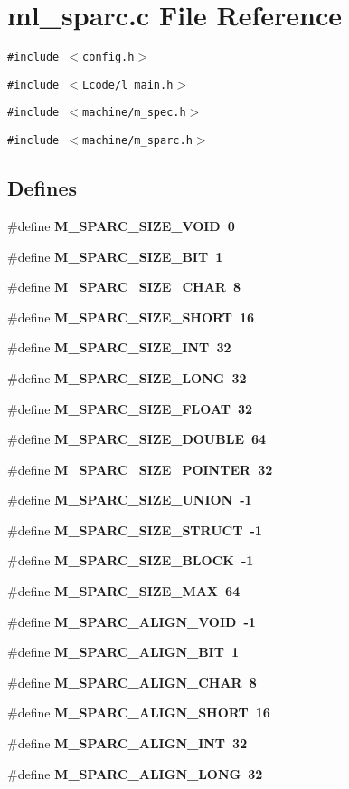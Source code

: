 \section{ml\_\-sparc.c File Reference}
\label{ml__sparc_8c}
{\tt \#include $<$config.h$>$}\par
{\tt \#include $<$Lcode/l\_\-main.h$>$}\par
{\tt \#include $<$machine/m\_\-spec.h$>$}\par
{\tt \#include $<$machine/m\_\-sparc.h$>$}\par
\subsection*{Defines}
\begin{CompactItemize}
\item 
\#define \bf{M\_\-SPARC\_\-SIZE\_\-VOID}~0
\item 
\#define \bf{M\_\-SPARC\_\-SIZE\_\-BIT}~1
\item 
\#define \bf{M\_\-SPARC\_\-SIZE\_\-CHAR}~8
\item 
\#define \bf{M\_\-SPARC\_\-SIZE\_\-SHORT}~16
\item 
\#define \bf{M\_\-SPARC\_\-SIZE\_\-INT}~32
\item 
\#define \bf{M\_\-SPARC\_\-SIZE\_\-LONG}~32
\item 
\#define \bf{M\_\-SPARC\_\-SIZE\_\-FLOAT}~32
\item 
\#define \bf{M\_\-SPARC\_\-SIZE\_\-DOUBLE}~64
\item 
\#define \bf{M\_\-SPARC\_\-SIZE\_\-POINTER}~32
\item 
\#define \bf{M\_\-SPARC\_\-SIZE\_\-UNION}~-1
\item 
\#define \bf{M\_\-SPARC\_\-SIZE\_\-STRUCT}~-1
\item 
\#define \bf{M\_\-SPARC\_\-SIZE\_\-BLOCK}~-1
\item 
\#define \bf{M\_\-SPARC\_\-SIZE\_\-MAX}~64
\item 
\#define \bf{M\_\-SPARC\_\-ALIGN\_\-VOID}~-1
\item 
\#define \bf{M\_\-SPARC\_\-ALIGN\_\-BIT}~1
\item 
\#define \bf{M\_\-SPARC\_\-ALIGN\_\-CHAR}~8
\item 
\#define \bf{M\_\-SPARC\_\-ALIGN\_\-SHORT}~16
\item 
\#define \bf{M\_\-SPARC\_\-ALIGN\_\-INT}~32
\item 
\#define \bf{M\_\-SPARC\_\-ALIGN\_\-LONG}~32
\item 

\end{CompactItemize}
